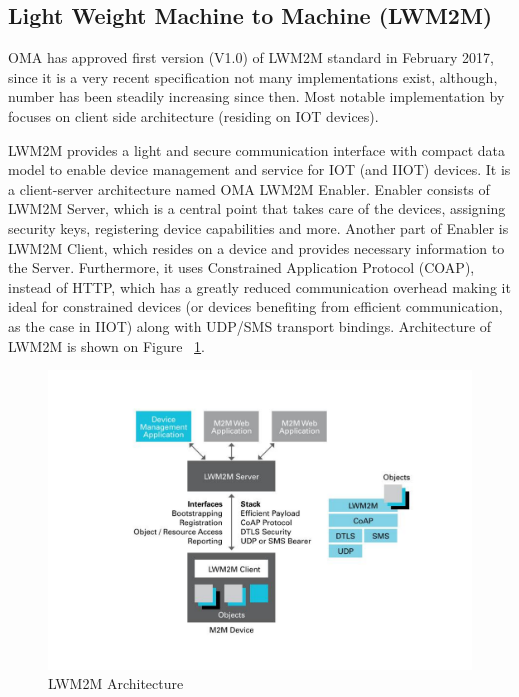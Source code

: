 \subsection{Light Weight Machine to Machine (LWM2M)}
\label{section:LWM2M}

OMA has approved first version (V1.0) of LWM2M standard in February 2017, since it is a very recent specification not many implementations exist, although, number has been steadily increasing since then. Most notable implementation by \cite{Rao2015} focuses on client side architecture (residing on IOT devices).

LWM2M provides a light and secure communication interface with compact data model to enable device management and service for IOT (and IIOT) devices. It is a client-server architecture named OMA LWM2M Enabler. Enabler consists of LWM2M Server, which is a central point that takes care of the devices, assigning security keys, registering device capabilities and more. Another part of Enabler is LWM2M Client, which resides on a device and provides necessary information to the Server. Furthermore, it uses Constrained Application Protocol (COAP), instead of HTTP, which has a greatly reduced communication overhead making it ideal for constrained devices (or devices benefiting from efficient communication, as the case in IIOT) along with UDP/SMS transport bindings. Architecture of LWM2M is shown on Figure ~\ref{fig:LWM2MArchitecture}.

\begin{figure}[ht]
	\begin{center}
		\includegraphics[width=\textwidth]{images/LWM2M-Architecture}
		\caption{LWM2M Architecture}
		\label{fig:LWM2MArchitecture}
	\end{center}
\end{figure}

